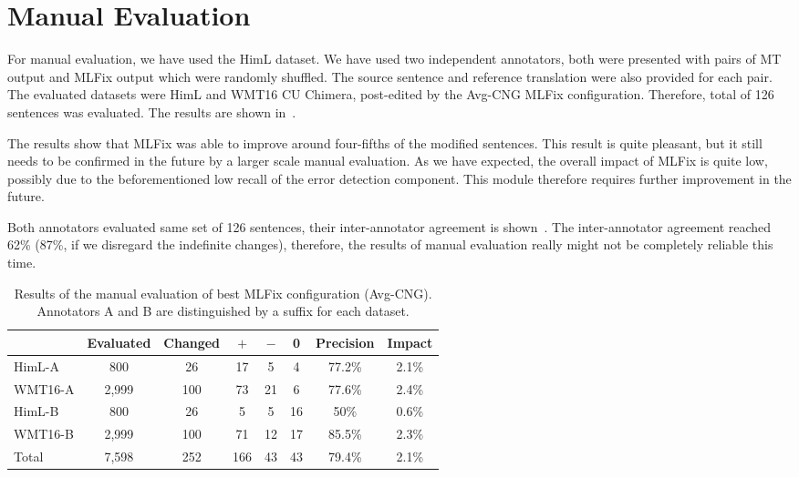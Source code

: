 \section{Manual Evaluation}

For manual evaluation, we have used the HimL dataset. We have used two independent annotators, both were presented with pairs
of MT output and MLFix output which were randomly shuffled. The source sentence and reference translation were also provided for each pair.
The evaluated datasets were HimL and WMT16 CU Chimera, post-edited by the Avg-CNG MLFix configuration. Therefore, total
of 126 sentences was evaluated. The results are shown in~.

The results show that MLFix was able to improve around four-fifths of the modified sentences. This
result is quite pleasant, but it still needs to be confirmed in the future by a larger scale manual
evaluation. As we have expected, the overall impact of MLFix is quite low, possibly due to the beforementioned
low recall of the error detection component. This module therefore requires further improvement
in the future.

Both annotators evaluated same set of 126 sentences, their inter-annotator agreement is shown~.
The inter-annotator agreement reached 62\% (87\%, if we disregard the indefinite changes),
therefore, the results of manual evaluation really might not be completely reliable this time.

\begin{table*}[t]
\centering
\small

\begin{tabular}{l|cc|ccc|cc}
  &  Evaluated  &  Changed  &  $+$  &  $-$  &  0  &  Precision  &  Impact  \\
\hline
HimL-A  &  800  &  26  &  17  &  5  &  4  &  77.2\%  &  2.1\%  \\
WMT16-A  &  2,999  &  100  &  73  &  21  &  6  &  77.6\%  &  2.4\%  \\
HimL-B  &  800  &  26  &  5  &  5  &  16  &  50\%  &  0.6\%  \\
WMT16-B  &  2,999  &  100  &  71  &  12  &  17  &  85.5\%  &  2.3\%  \\
\hline
Total &  7,598  &  252  &  166  &  43  &  43  &  79.4\%  &  2.1\%  \\
\end{tabular}
\caption[Czech MLFix manual evaluation]{
Results of the manual evaluation of best MLFix configuration (Avg-CNG). Annotators
A and B are distinguished by a suffix for each dataset.
}
\label{maneval-final}
\end{table*}



